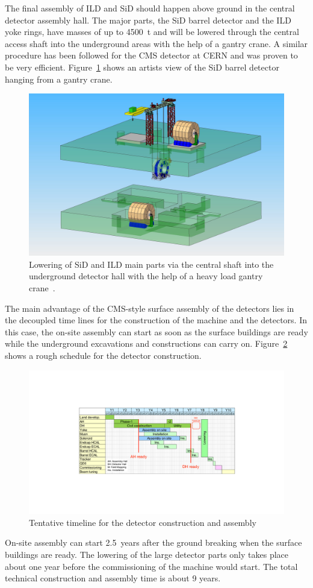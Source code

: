 The final assembly of ILD and SiD should happen above ground in the central detector assembly hall. The major parts, the SiD barrel detector and the ILD yoke rings, have masses of up to 4500~t and will be lowered through the central access shaft into the underground areas with the help of a gantry crane. A similar procedure has been followed for the CMS detector at CERN and was proven to be very efficient. Figure~\ref{fig:integration:gantry_crane} shows an artists view of the SiD barrel detector hanging from a gantry crane.
\begin{figure}[h!]
\centering
\includegraphics[width=0.8\hsize]{Integration/fig/gantry_crane.png}
\caption{\label{fig:integration:gantry_crane}Lowering of SiD and ILD main parts via the central shaft into the underground detector hall with the help of a heavy load gantry crane~\cite{ild:bib:gantry_crane}.}
\end{figure}

The main advantage of the CMS-style surface assembly of the detectors lies in the decoupled time lines for the construction of the machine and the detectors. In this case, the on-site assembly can start as soon as the surface buildings are ready while the underground excavations and constructions can carry on. Figure~\ref{fig:integration:assembly_timeline} shows a rough schedule for the detector construction.
\begin{figure}[h!]
\centering
\includegraphics[width=0.8\hsize]{Integration/fig/Detector_Assembly_Timeline.pdf}
\caption{\label{fig:integration:assembly_timeline}Tentative timeline for the detector construction and assembly~\cite{ild:bib:ejade_mdi, ild:bib:assembly}}
\end{figure}
On-site assembly can start 2.5~years after the ground breaking when the surface buildings are ready. The lowering of the large detector parts only takes place about one year before the commissioning of the machine would start. The total technical construction and assembly time is about 9 years.